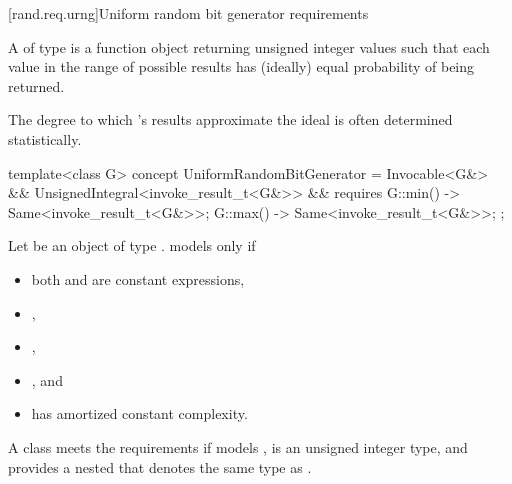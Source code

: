 %




[rand.req.urng]{Uniform random bit generator requirements}%
%

\pnum
A 
 of type 
is a function object
returning unsigned integer values
such that each value
in the range of possible results
has (ideally) equal probability
of being returned.
\begin{note}
 The degree to which 's results
 approximate the ideal
 is often determined statistically.
\end{note}

\begin{codeblock}
template<class G>
  concept UniformRandomBitGenerator =
    Invocable<G&> && UnsignedIntegral<invoke_result_t<G&>> &&
    requires {
      { G::min() } -> Same<invoke_result_t<G&>>;
      { G::max() } -> Same<invoke_result_t<G&>>;
    };
\end{codeblock}

\pnum
Let  be an object of type .  models
 only if

\begin{itemize}
\item both  and  are constant
  expressions,
\item {},
\item {},
\item {}, and
\item {} has amortized constant complexity.
\end{itemize}

%
%
\pnum
A class  meets the  requirements if
 models ,
 is an unsigned integer type,
and
 provides a nested  
that denotes the same type as .


